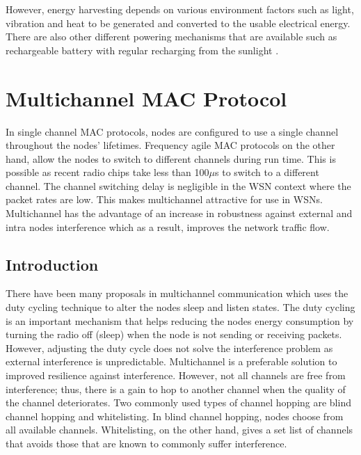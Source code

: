 However, energy harvesting depends on various environment factors such as light, vibration and heat to be generated and converted to the usable electrical energy. There are also other different powering mechanisms that are available such as rechargeable battery with regular recharging from the sunlight \cite{macsurvey}. 

\section{Multichannel MAC Protocol}
In single channel MAC protocols, nodes are configured to use a single channel throughout the nodes' lifetimes. Frequency agile MAC protocols on the other hand, allow the nodes to switch to different channels during run time. This is possible as recent radio chips take less than 100$\mu$s to switch to a different channel. The channel switching delay is negligible in the WSN context where the packet rates are low. This makes multichannel attractive for use in WSNs. Multichannel has the advantage of an increase in robustness against external and intra nodes interference which as a result, improves the network traffic flow.


\subsection{Introduction}

There have been many proposals in multichannel communication which uses the duty cycling technique to alter the nodes sleep and listen states. The duty cycling is an important mechanism that helps reducing the nodes energy consumption by turning the radio off (sleep) when the node is not sending or receiving packets. However, adjusting the duty cycle does not solve the interference problem as external interference is unpredictable. Multichannel is a preferable solution to improved resilience against interference. However, not all channels are free from interference; thus, there is a gain to hop to another channel when the quality of the channel deteriorates. Two commonly used types of channel hopping \cite{watteyne} are blind channel hopping and whitelisting. In blind channel hopping, nodes choose from all available channels. 
Whitelisting, on the other hand, gives a set list of channels that avoids those that are known to commonly suffer interference.

